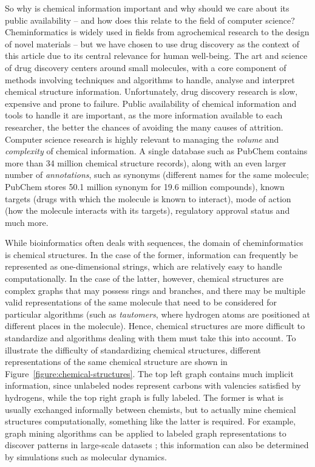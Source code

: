 \documentclass{../sig-alternate}
\begin{document}
So why is chemical information important and why should we care about
its public availability -- and how does this relate to the field of
computer science? Cheminformatics is widely used in fields 
from agrochemical research to the design of
novel materials -- but we have chosen to use drug discovery as the context
of this article due to its central relevance for human well-being.
The art and science of drug discovery centers around small
molecules, with a core component of methods involving 
techniques and algorithms to handle, analyse and interpret
chemical structure information. 
Unfortunately, drug discovery research is slow, expensive and prone to failure. 
Public availability of chemical information and
tools to handle it are important, as the more information available to each
researcher, the better the chances of avoiding the many causes of attrition. 
Computer science research is highly relevant to managing the \textit{volume} 
and \textit{complexity} of chemical information. 
A single database such as PubChem contains more than 34 million
chemical structure records), along with an even larger number of
\emph{annotations}, such as synonyms (different names for the same molecule; 
PubChem stores 50.1 million synonym for 19.6 million compounds),
known targets (drugs with which the molecule is known to interact),
mode of action (how the molecule interacts with its targets),
regulatory approval status and much more. 

While bioinformatics often deals with sequences, the
domain of cheminformatics is chemical structures. 
In the case of the former, information can frequently be represented as
one-dimensional strings, which are relatively easy to handle
computationally. In the case of the latter, however, chemical
structures are complex graphs that may possess rings and branches, 
and there may be multiple valid representations of the same molecule 
that need to be considered for particular algorithms 
(such as \emph{tautomers}, where hydrogen atoms are positioned at 
different places in the molecule). Hence, chemical
structures are more difficult to standardize and
algorithms dealing with them must take this into account.
To illustrate the difficulty of standardizing chemical structures,
different representations of the same chemical structure are shown in
Figure~\ref{figure:chemical-structures}. The top left graph contains
much implicit information, since unlabeled nodes represent carbons
with valencies satisfied by hydrogens, while the top right graph is 
fully labeled. The former is what is 
usually exchanged informally between chemists, but to actually mine
chemical structures computationally, something like the latter is
required.  For example, graph mining algorithms can be applied to
labeled graph representations to discover patterns in large-scale
datasets \cite{horst2009}; this information can also be determined 
by simulations such as molecular dynamics.
\end{document}
